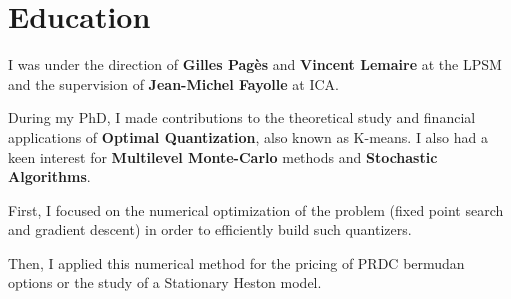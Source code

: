 \documentclass[]{deedy-resume-openfont}
\begin{document}
\sectionsep




\section{Education}
\sectionsep

I was under the direction of \textbf{Gilles Pagès} and \textbf{Vincent Lemaire} at the LPSM and the supervision of \textbf{Jean-Michel Fayolle} at ICA.

\vspace{0.2cm}
During my PhD, I made contributions to the theoretical study and financial applications of \textbf{Optimal Quantization}, also known as K-means. I also had a keen interest for \textbf{Multilevel Monte-Carlo} methods and \textbf{Stochastic Algorithms}.
\vspace{0.1cm}
\begin{tightemize}
	\item[\diamond] First, I focused on the numerical optimization of the problem (fixed point search and gradient descent) in order to efficiently build such quantizers.
	\item[\diamond] Then, I applied this numerical method for the pricing of PRDC bermudan options or the study of a Stationary Heston model.
\end{tightemize}

\sectionsep

\end{document}
